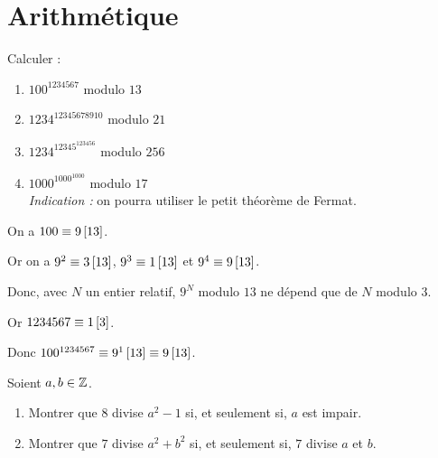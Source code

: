 \section{Arithmétique}

\begin{exo}
Calculer :

\begin{enumerate}
\item \(100^{1234567}\) modulo \(13\) \\

\item \(1234^{12345678910}\) modulo \(21\) \\

\item \(1234^{12345^{123456}}\) modulo \(256\) \\

\item \(1000^{1000^{1000}}\) modulo \(17\) \\

\textit{Indication :} on pourra utiliser le petit théorème de Fermat.
\end{enumerate}
\end{exo}

\begin{corr}[1]
On a \(100\equiv9\left[13\right]\).

Or on a \(9^2\equiv3\left[13\right]\), \(9^3\equiv1\left[13\right]\) et \(9^4\equiv9\left[13\right]\).

Donc, avec \(N\) un entier relatif, \(9^N\) modulo \(13\) ne dépend que de \(N\) modulo \(3\).

Or \(1234567\equiv1\left[3\right]\).

Donc \(100^{1234567}\equiv9^1\left[13\right]\equiv9\left[13\right]\).
\end{corr}

\begin{exo}
Soient \(a,b\in\mathbb{Z}\).

\begin{enumerate}
\item Montrer que \(8\) divise \(a^2-1\) si, et seulement si, \(a\) est impair. \\

\item Montrer que \(7\) divise \(a^2+b^2\) si, et seulement si, \(7\) divise \(a\) et \(b\).
\end{enumerate}
\end{exo}

\begin{corr}
\end{corr}

